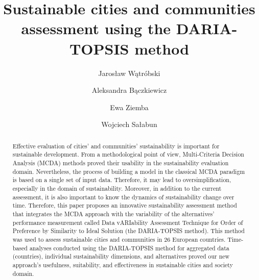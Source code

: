 \documentclass[final,5p,times,twocolumn,authoryear]{elsarticle}
\begin{document}
\begin{frontmatter}


\title{Sustainable cities and communities assessment using the DARIA-TOPSIS method}



\author[1]{Jarosław Wątróbski}

\author[1,2]{Aleksandra Bączkiewicz}

\author[3]{Ewa Ziemba}

\author[4]{Wojciech Sałabun}


\address[1]{Institute of Management, University of Szczecin, ul. Cukrowa 8, 71-004 Szczecin, Poland}
\address[2]{Doctoral School of University of Szczecin, ul. Mickiewicza 16, 70-383 Szczecin, Poland}
\address[3]{Department of Business Informatics and International Accounting, Faculty of Finance and Insurance, University of Economics in Katowice, ul. 1 Maja 50, 40-287 Katowice, Poland}
\address[4]{National Institute of Telecommunications, Szachowa 1, 04-894 Warsaw, Poland}



\begin{abstract}
Effective evaluation of cities' and communities' sustainability is important for sustainable development. From a methodological point of view, Multi-Criteria Decision Analysis (MCDA) methods proved their usability in the sustainability evaluation domain. Nevertheless, the process of building a model in the classical MCDA paradigm is based on a single set of input data. Therefore, it may lead to oversimplification, especially in the domain of sustainability. Moreover, in addition to the current assessment, it is also important to know the dynamics of sustainability change over time. Therefore, this paper proposes an innovative sustainability assessment method that integrates the MCDA approach with the variability of the alternatives' performance measurement called Data vARIability Assessment Technique for Order of Preference by Similarity to Ideal Solution (the DARIA-TOPSIS method). This method was used to assess sustainable cities and communities in 26 European countries. Time-based analyses conducted using the DARIA-TOPSIS method for aggregated data (countries), individual sustainability dimensions, and alternatives proved our new approach's usefulness, suitability, and effectiveness in sustainable cities and society domain.
\end{abstract}


\end{frontmatter}
\end{document}
